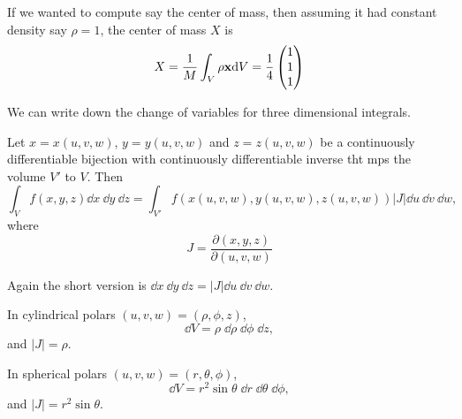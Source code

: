 \documentclass[a4paper]{scrreprt}
\begin{document}
\begin{example}
If we wanted to compute say the center of mass, then assuming it had constant density say $\rho = 1$, the center of mass $X$ is
$$
X = \frac{1}{M} \int_V \rho \mathbf{x} \mathrm{d} V = \frac{1}{4}\begin{pmatrix}
	1\\ 1\\ 1
\end{pmatrix}
$$
\end{example}

We can write down the change of variables for three dimensional integrals.

\begin{proposition}
	Let $x = x(u, v, w)$, $y = y(u, v, w)$ and $z = z(u, v, w)$ be a continuously differentiable bijection with continuously differentiable inverse tht mps the volume $V'$ to $V$. Then
	$$
	\int_V f(x, y, z) \dd x \ \dd y \ \dd z = \int_{V'} f(x(u, v, w), y(u, v, w), z(u, v, w)) |J| \dd u\  \dd v\ \dd w,
	$$
	where
	$$
	J = \frac{\partial(x, y, z)}{\partial(u, v, w)}
	$$
\end{proposition}
Again the short version is $\dd x\ \dd y\ \dd z = |J| \dd u\ \dd v\ \dd w$.

\begin{example}
	In cylindrical polars $(u, v, w) = (\rho, \phi, z)$,
	$$
	\dd V = \rho \; \dd\rho \; \dd \phi \; \dd z,
	$$
	and $|J| = \rho$.

	In spherical polars $(u, v, w) = (r, \theta, \phi)$,
	$$
	\dd V = r^2 \sin \theta \; \dd r \; \dd \theta \; \dd \phi,
	$$
	and $|J| = r^2 \sin \theta$.
\end{example}
\end{document}
